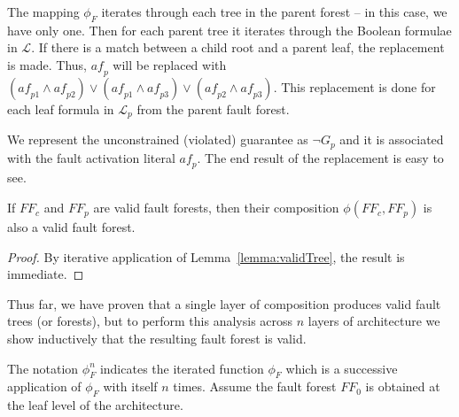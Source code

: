 The mapping $\phi_F$ iterates through each tree in the parent forest -- in this case, we have only one. Then for each parent tree it iterates through the Boolean formulae in $\mathcal{L}$. If there is a match between a child root and a parent leaf, the replacement is made.
Thus, $\mathit{af}_p$ will be replaced with $(\mathit{af}_{p1} \land \mathit{af}_{p2}) \lor (\mathit{af}_{p1} \land \mathit{af}_{p3}) \lor (\mathit{af}_{p2} \land \mathit{af}_{p3})$. This replacement is done for each leaf formula in $\mathcal{L}_p$ from the parent fault forest. 

We represent the unconstrained (violated) guarantee as $\neg G_p$ and it is associated with the fault activation literal $\mathit{af}_p$. The end result of the replacement is easy to see.

\begin{lemma} If $\mathit{FF}_c$ and $\mathit{FF}_p$ are valid fault forests, then their composition $\phi(\mathit{FF}_c, \mathit{FF}_p)$ is also a valid fault forest. 
\begin{proof}
By iterative application of Lemma~\ref{lemma:validTree}, the result is immediate.
\end{proof}
\label{lemma:validForest}
\end{lemma}

Thus far, we have proven that a single layer of composition produces valid fault trees (or forests), but to perform this analysis across $n$ layers of architecture we show inductively that the resulting fault forest is valid. 

The notation $\phi_F^n$ indicates the iterated function $\phi_F$ which is a successive application of $\phi_F$ with itself $n$ times. Assume the fault forest $\mathit{FF}_0$ is obtained at the leaf level of the architecture.

